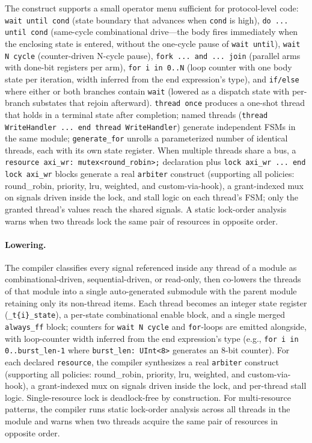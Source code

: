 \documentclass[manuscript]{acmart}
\begin{document}
The construct supports a small operator menu sufficient for protocol-level code: \texttt{wait until cond} (state boundary that advances when \texttt{cond} is high), \texttt{do ... until cond} (same-cycle combinational drive---the body fires immediately when the enclosing state is entered, without the one-cycle pause of \texttt{wait until}), \texttt{wait N cycle} (counter-driven N-cycle pause), \texttt{fork ... and ... join} (parallel arms with done-bit registers per arm), \texttt{for i in 0..N} (loop counter with one body state per iteration, width inferred from the end expression's type), and \texttt{if/else} where either or both branches contain \texttt{wait} (lowered as a dispatch state with per-branch substates that rejoin afterward). \texttt{thread once} produces a one-shot thread that holds in a terminal state after completion; named threads (\texttt{thread WriteHandler ... end thread WriteHandler}) generate independent FSMs in the same module; \texttt{generate\_for} unrolls a parameterized number of identical threads, each with its own state register. When multiple threads share a bus, a \texttt{resource axi\_wr: mutex<round\_robin>;} declaration plus \texttt{lock axi\_wr ... end lock axi\_wr} blocks generate a real \texttt{arbiter} construct (supporting all policies: round\_robin, priority, lru, weighted, and custom-via-hook), a grant-indexed mux on signals driven inside the lock, and stall logic on each thread's FSM; only the granted thread's values reach the shared signals. A static lock-order analysis warns when two threads lock the same pair of resources in opposite order.

\paragraph{Lowering.} The compiler classifies every signal referenced inside any thread of a module as combinational-driven, sequential-driven, or read-only, then co-lowers the threads of that module into a single auto-generated submodule with the parent module retaining only its non-thread items. Each thread becomes an integer state register (\texttt{\_t\{i\}\_state}), a per-state combinational enable block, and a single merged \texttt{always\_ff} block; counters for \texttt{wait N cycle} and \texttt{for}-loops are emitted alongside, with loop-counter width inferred from the end expression's type (e.g., \texttt{for i in 0..burst\_len-1} where \texttt{burst\_len: UInt<8>} generates an 8-bit counter). For each declared \texttt{resource}, the compiler synthesizes a real \texttt{arbiter} construct (supporting all policies: round\_robin, priority, lru, weighted, and custom-via-hook), a grant-indexed mux on signals driven inside the lock, and per-thread stall logic. Single-resource lock is deadlock-free by construction. For multi-resource patterns, the compiler runs static lock-order analysis across all threads in the module and warns when two threads acquire the same pair of resources in opposite order.
\end{document}
